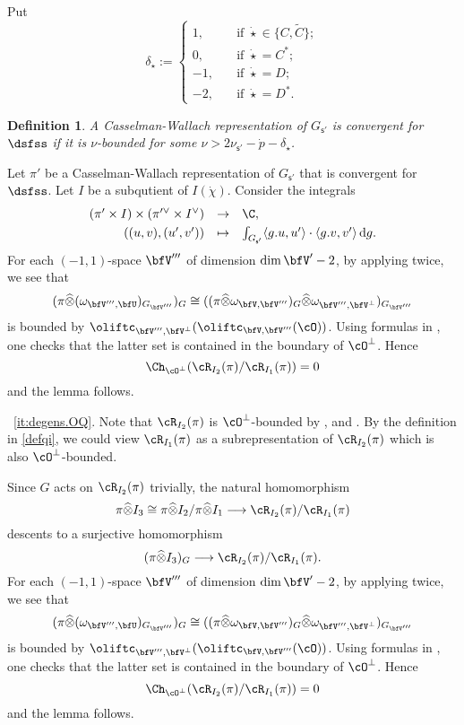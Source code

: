 \documentclass[12pt,a4paper]{amsart}
\newcommand{\od}{\operatorname{d}}
\newcommand{\la}{\langle}
\newcommand{\ra}{\rangle}
\newcommand{\be}{\begin {equation}}
\newcommand{\ee}{\end {equation}}
\numberwithin{equation}{section}
\newtheorem{defn}[thm]{Definition}
\theoremstyle{remark}
\def\abfV{\bfV'}
\def\bfVpe{\bfV^\perp}
\def\totimes{\widehat{\otimes}}
\begin{document}
Put
\[
\delta_{\dot \star}:=\begin{cases}
1,& \quad\textrm{if $\dot \star\in \{C, \widetilde C\}$}; \\
0,& \quad\textrm{if $\dot \star=C^*$}; \\
-1,& \quad\textrm{if $\dot \star= D$};\\
-2,& \quad\textrm{if $\dot \star=D^*$}.
\end{cases}
\]

 \begin{defn}\label{defn:CRcov}
A Casselman-Wallach representation of $G_{\mathsf s'}$ is convergent for $\dsfss$
if it is $\nu$-bounded for some
$\nu>
2\nu_{\mathsf s'}-\dot p-\delta_{\dot \star} $.
\end{defn}


Let $\pi'$ be a  Casselman-Wallach representation of $G_{\mathsf s'}$ that is convergent for $\dsfss$. Let $I$ be a subqutient of $I(\dot{\chi})$. Consider the integrals
\be\label{convint004}
\begin{array}{rcl}
 (\pi' \times I)\times (\pi'^\vee \times I^\vee )&\rightarrow &\C, \smallskip \\
   ((u,v),(u',v')) &\mapsto &\int_{G_{\mathsf s'}} \la g.u, u'\ra\cdot \la g.v, v'\ra \od\! g.
   \end{array}
 \ee
For each $(-1,1)$-space $\bfV'''$ of dimension $\dim
\abfV-2$, by applying  twice,
we see that
\[
(\pi\totimes (\omega_{\bfV''',\bfU})_{ G_{\bfV'''}})_{G}\cong ((\pi\totimes \omega_{\bfV,\bfV'''})_G\totimes \omega_{\bfV''',\bfVpe})_{ G_{\bfV'''}}
\]
 is
bounded by
$\oliftc_{\bfV''', \bfVpe}(\oliftc_{\bfV,\bfV'''}(\cO))$. Using formulas in  \cite[Theorem~5.2 and 5.6]{DKPC}, one checks that the latter set is contained in the boundary of  $\cO^\perp
$. Hence
\[
\Ch_{\cO^\perp}(\cR_{I_2}(\pi)/\cR_{I_1}(\pi)) = 0
\] and the lemma follows.




~\ref{it:degens.OQ}.
Note that $\cR_{I_2}(\pi)$ is $\cO^\perp$-bounded by ,
 and \cite[Theorem~1.4]{SV}.
By the definition in \cref{defqi}, we could view $\cR_{I_1}(\pi)$ as a
subrepresentation of  $ \cR_{I_2}(\pi)$ which is also $\cO^\perp$-bounded.

Since $G$ acts on $\cR_{I_2}(\pi)$ trivially, the natural homomorphism
\[
  \pi\totimes I_3\cong \pi\totimes I_2/\pi \totimes I_1\longrightarrow \cR_{I_2}(\pi)/\cR_{I_1}(\pi)\]
descents to a surjective homomorphism
\[
  (\pi\totimes  I_3)_{G}\longrightarrow \cR_{I_2}(\pi)/\cR_{I_1}(\pi).
\]
For each $(-1,1)$-space $\bfV'''$ of dimension $\dim
\abfV-2$, by applying  twice,
we see that
\[
(\pi\totimes (\omega_{\bfV''',\bfU})_{ G_{\bfV'''}})_{G}\cong ((\pi\totimes \omega_{\bfV,\bfV'''})_G\totimes \omega_{\bfV''',\bfVpe})_{ G_{\bfV'''}}
\]
 is
bounded by
$\oliftc_{\bfV''', \bfVpe}(\oliftc_{\bfV,\bfV'''}(\cO))$. Using formulas in  \cite[Theorem~5.2 and 5.6]{DKPC}, one checks that the latter set is contained in the boundary of  $\cO^\perp
$. Hence
\[
\Ch_{\cO^\perp}(\cR_{I_2}(\pi)/\cR_{I_1}(\pi)) = 0
\] and the lemma follows.
\end{document}
